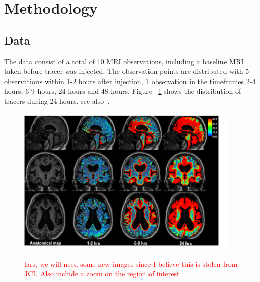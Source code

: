 \documentclass[11pt,a4paper]{article}
\renewcommand{\comment}[1]{\textcolor{red}{#1}}
\begin{document}
\section{Methodology}


\subsection*{Data}
The data consist of a total of 10 MRI observations, including a baseline MRI taken before tracer was injected. The observation points are distributed with 5 observations within 1-2 hours after injection, 1 observation in the timeframes 2-4 hours, 6-9 hours, 24 hours and 48 hours. Figure ~\ref{fig1} shows the distribution of tracers during 24 hours, see also~\cite{ringstad2017glymphatic}.   

\begin{figure}
\includegraphics[width=0.95\textwidth]{GMRI.png} 
\label{fig1} 
\caption{\comment{lars, we will need some new images since I believe this is stolen from JCI. Also include a zoom on the region of interest}}
\end{figure}
\end{document}
